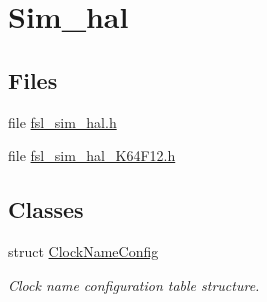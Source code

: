 \hypertarget{group__sim__hal}{}\section{Sim\+\_\+hal}
\label{group__sim__hal}
\subsection*{Files}
\begin{DoxyCompactItemize}
\item 
file \hyperlink{fsl__sim__hal_8h}{fsl\+\_\+sim\+\_\+hal.\+h}
\item 
file \hyperlink{fsl__sim__hal__K64F12_8h}{fsl\+\_\+sim\+\_\+hal\+\_\+\+K64\+F12.\+h}
\end{DoxyCompactItemize}
\subsection*{Classes}
\begin{DoxyCompactItemize}
\item 
struct \hyperlink{structClockNameConfig}{Clock\+Name\+Config}
\begin{DoxyCompactList}\small\item\em Clock name configuration table structure. \end{DoxyCompactList}\end{DoxyCompactItemize}
